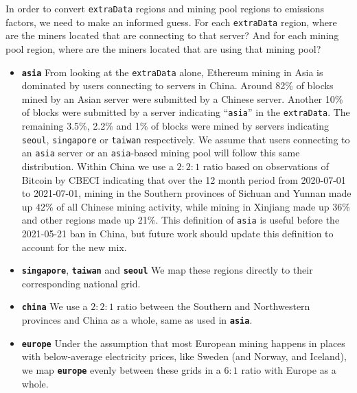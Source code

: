 \begin{appendices}
In order to convert \texttt{extraData} regions and mining pool regions to emissions factors, we need to make an informed guess. For each \texttt{extraData} region, where are the miners located that are connecting to that server? And for each mining pool region, where are the miners located that are using that mining pool?

\begin{itemize}

    \item \textbf{\texttt{asia}} From looking at the \texttt{extraData} alone, Ethereum mining in Asia is dominated by users connecting to servers in China. Around 82\% of blocks mined by an Asian server were submitted by a Chinese server. Another 10\% of blocks were submitted by a server indicating ``\texttt{asia}'' in the \texttt{extraData}. The remaining 3.5\%, 2.2\% and 1\% of blocks were mined by servers indicating \texttt{seoul}, \texttt{singapore} or \texttt{taiwan} respectively. We assume that users connecting to an \texttt{asia} server or an \texttt{asia}-based mining pool will follow this same distribution. Within China we use a $2:2:1$ ratio based on observations of Bitcoin by CBECI indicating that over the 12 month period from 2020-07-01 to 2021-07-01, mining in the Southern provinces of Sichuan and Yunnan made up 42\% of all Chinese mining activity, while mining in Xinjiang made up 36\% and other regions made up 21\%. This definition of \texttt{asia} is useful before the 2021-05-21 ban in China, but future work should update this definition to account for the new mix.

    \item \textbf{\texttt{singapore}}, \textbf{\texttt{taiwan}} and \textbf{\texttt{seoul}} We map these regions directly to their corresponding national grid.
    
    \item \textbf{\texttt{china}} We use a $2:2:1$ ratio between the Southern and Northwestern provinces and China as a whole, same as used in \texttt{\textbf{asia}}.
    
    \item \textbf{\texttt{europe}} Under the assumption that most European mining happens in places with below-average electricity prices, like Sweden (and Norway, and Iceland), we map \textbf{\texttt{europe}} evenly between these grids in a $6:1$ ratio with Europe as a whole.
    

\end{itemize}
\end{appendices}
